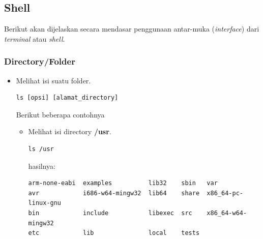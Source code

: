 \documentclass[12pt,]{article}
\begin{document}
	\subsection{Shell}
	Berikut akan dijelaskan secara mendasar penggunaan antar-muka (\textit{interface}) dari \textit{terminal} atau \textit{shell}.
	\subsubsection{Directory/Folder}
	\begin{itemize}
		\item Melihat isi suatu folder.
		\begin{verbatim}
ls [opsi] [alamat_directory]
		\end{verbatim}
		Berikut beberapa contohnya
		\begin{itemize}
			\item Melihat isi directory \textbf{/usr}.
			\begin{verbatim}
ls /usr
			\end{verbatim}
			hasilnya:
			\begin{verbatim}
arm-none-eabi  examples          lib32    sbin   var
avr            i686-w64-mingw32  lib64    share  x86_64-pc-linux-gnu
bin            include           libexec  src    x86_64-w64-mingw32
etc            lib               local    tests
			\end{verbatim}
			

\end{itemize}
\end{itemize}
\end{document}
